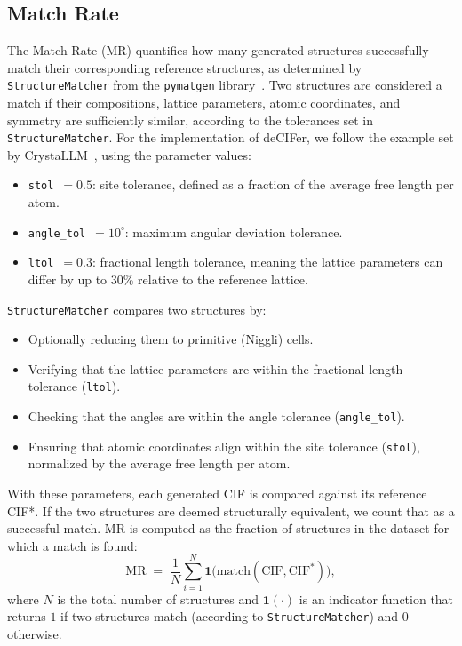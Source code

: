 \subsection{Match Rate}\label{sup-sec:match_rate}

The Match Rate (MR) quantifies how many generated structures successfully match their corresponding reference structures, as determined by \texttt{StructureMatcher} from the \texttt{pymatgen} library~\cite{Ong2013}. Two structures are considered a match if their compositions, lattice parameters, atomic coordinates, and symmetry are sufficiently similar, according to the tolerances set in \texttt{StructureMatcher}. For the implementation of deCIFer, we follow the example set by CrystaLLM~\cite{antunes2024crystalstructuregenerationautoregressive}, using the parameter values:
\begin{itemize}
    \item \texttt{\small stol}~\(= 0.5\): site tolerance, defined as a fraction of the average free length per atom.
    \item \texttt{\small angle\_tol}~\(= 10^\circ\): maximum angular deviation tolerance.
    \item \texttt{\small ltol}~\(= 0.3\): fractional length tolerance, meaning the lattice parameters can differ by up to 30\% relative to the reference lattice.
\end{itemize}
\texttt{StructureMatcher} compares two structures by:
\begin{itemize}
    \item Optionally reducing them to primitive (Niggli) cells.
    \item Verifying that the lattice parameters are within the fractional length tolerance (\texttt{ltol}).
    \item Checking that the angles are within the angle tolerance (\texttt{angle\_tol}).
    \item Ensuring that atomic coordinates align within the site tolerance (\texttt{stol}), normalized by the average free length per atom.
\end{itemize}
With these parameters, each generated CIF is compared against its reference CIF*. If the two structures are deemed structurally equivalent, we count that as a successful match. MR is computed as the fraction of structures in the dataset for which a match is found:
\begin{equation}
    \mathrm{MR} \;=\; \frac{1}{N}\sum_{i=1}^{N} \mathbf{1}\bigl(\text{match}(\mathrm{CIF},\mathrm{CIF}^*)\bigr),
\end{equation}
where $N$ is the total number of structures and $\mathbf{1}(\cdot)$ is an indicator function that returns $1$ if two structures match (according to \texttt{StructureMatcher}) and $0$ otherwise.


